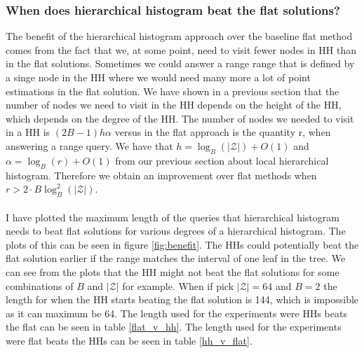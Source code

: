 \documentclass[11pt]{article}
\theoremstyle{definition}
\begin{document}
\subsubsection{When does hierarchical histogram beat the flat solutions?}
The benefit of the hierarchical histogram approach over the baseline flat method comes from the fact that we, at some point, need to visit fewer nodes in HH than in the flat solutions. Sometimes we could answer a range range that is defined by a singe node in the HH where we would need many more a lot of point estimations in the flat solution. We have shown in a previous section that the number of nodes we need to visit in the HH depends on the height of the HH, which depends on the degree of the HH. The number of nodes we needed to visit in a HH is $(2B-1)h\alpha$ versus in the flat approach is the quantity r, when answering a range query. We have that $h=\log_B(|\mathcal{Z}|)+O(1)$ and $\alpha=\log_B(r)+O(1)$ from our previous section about local hierarchical histogram. Therefore we obtain an improvement over flat methods when $r>2\cdot B \log_B^2(|\mathcal{Z}|)$. \\ \\ I have plotted the maximum length of the queries that hierarchical histogram needs to beat flat solutions for various degrees of a hierarchical histogram. The plots of this can be seen in figure \ref{fig:benefit}. The HHs could potentially beat the flat solution earlier if the range matches the interval of one leaf in the tree. We can see from the plots that the HH might not beat the flat solutions for some combinations of $B$ and $|\mathcal{Z}|$ for example. When if pick $|\mathcal{Z}| = 64$ and $B=2$ the length for when the HH starts beating the flat solution is 144, which is impossible as it can maximum be 64. The length used for the experiments were HHs beats the flat can be seen in table \ref{flat_v_hh}. The length used for the experiments were flat beats the HHs can be seen in table \ref{hh_v_flat}. 
\end{document}
